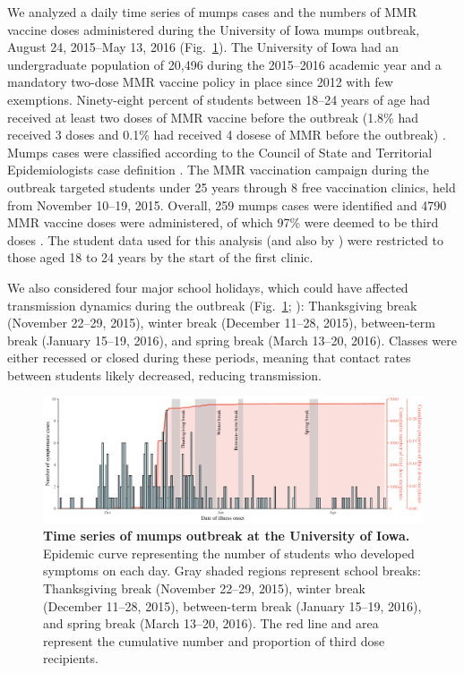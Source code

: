 \documentclass[12pt]{article}
\newcommand{\fref}[1]{Fig.~\ref{fig:#1}}
\begin{document}
We analyzed a daily time series of mumps cases and the numbers of MMR vaccine doses administered during the University of Iowa mumps outbreak, August 24, 2015--May 13, 2016 (\fref{data}).
The University of Iowa had an undergraduate population of 20,496 during the 2015--2016 academic year and a mandatory two-dose MMR vaccine policy in place since 2012 with few exemptions.
Ninety-eight percent of students between 18--24 years of age had received at least two doses of MMR vaccine before the outbreak (1.8\% had received 3 doses and 0.1\% had received 4 dosese of MMR before the outbreak) \citep{cardemil2017effectiveness}.
Mumps cases were classified according to the Council of State and Territorial Epidemiologists case definition \citep{casedef}. 
The MMR vaccination campaign during the outbreak targeted students under 25 years through 8 free vaccination clinics,  held from November 10--19, 2015. 
Overall, 259 mumps cases were identified and 4790 MMR vaccine doses were administered, of which 97\% were deemed to be third doses \citep{cardemil2017effectiveness}.
The student data used for this analysis (and also by \cite{cardemil2017effectiveness}) were restricted to those aged 18 to 24 years by the start of the first clinic. 

We also considered four major school holidays, which could have affected transmission dynamics during the outbreak (\fref{data}; \cite{iowa}): 
Thanksgiving break (November 22--29, 2015), winter break (December 11--28, 2015), between-term break (January 15--19, 2016), and spring break (March 13--20, 2016).
Classes were either recessed or closed during these periods, meaning that contact rates between students likely decreased, reducing transmission.

\begin{figure}[!th]
\includegraphics[width=\textwidth]{../figure/time_series.pdf}
\caption{
\textbf{Time series of mumps outbreak at the University of Iowa.}
Epidemic curve representing the number of students who developed symptoms on each day.
Gray shaded regions represent school breaks: Thanksgiving break (November 22--29, 2015), winter break (December 11--28, 2015), between-term break (January 15--19, 2016), and spring break (March 13--20, 2016).
The red line and area represent the cumulative number and proportion of third dose recipients.
}
\label{fig:data}
\end{figure}
\end{document}

